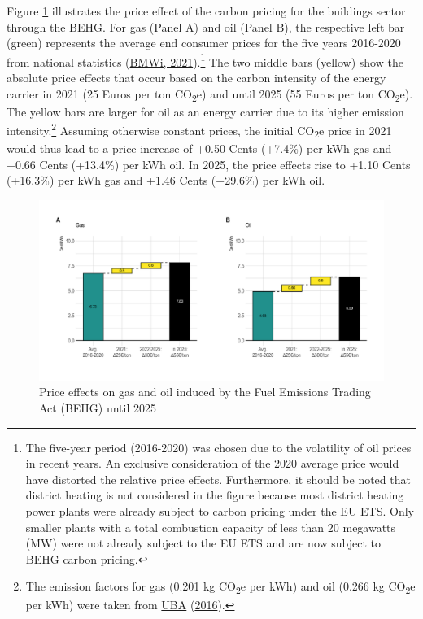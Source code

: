 \documentclass[12pt,twoside]{reedthesis}
\begin{document}
Figure \ref{fig:behg} illustrates the price effect of the carbon pricing for the buildings sector through the BEHG. For gas (Panel A) and oil (Panel B), the respective left bar (green) represents the average end consumer prices for the five years 2016-2020 from national statistics (\protect\hyperlink{ref-bmwi21}{BMWi, 2021}).\footnote{The five-year period (2016-2020) was chosen due to the volatility of oil prices in recent years. An exclusive consideration of the 2020 average price would have distorted the relative price effects. Furthermore, it should be noted that district heating is not considered in the figure because most district heating power plants were already subject to carbon pricing under the EU ETS. Only smaller plants with a total combustion capacity of less than 20 megawatts (MW) were not already subject to the EU ETS and are now subject to BEHG carbon pricing.} The two middle bars (yellow) show the absolute price effects that occur based on the carbon intensity of the energy carrier in 2021 (25 Euros per ton CO\textsubscript{2}e) and until 2025 (55 Euros per ton CO\textsubscript{2}e). The yellow bars are larger for oil as an energy carrier due to its higher emission intensity.\footnote{The emission factors for gas (0.201 kg CO\textsubscript{2}e per kWh) and oil (0.266 kg CO\textsubscript{2}e per kWh) were taken from \protect\hyperlink{ref-uba16}{UBA} (\protect\hyperlink{ref-uba16}{2016}).} Assuming otherwise constant prices, the initial CO\textsubscript{2}e price in 2021 would thus lead to a price increase of +0.50 Cents (+7.4\%) per kWh gas and +0.66 Cents (+13.4\%) per kWh oil. In 2025, the price effects rise to +1.10 Cents (+16.3\%) per kWh gas and +1.46 Cents (+29.6\%) per kWh oil.
\begin{figure}

{\centering \includegraphics[width=1\linewidth]{figure/price_effect_behg} 

}

\caption[BEHG carbon price effects on gas and oil until 2025]{Price effects on gas and oil induced by the Fuel Emissions Trading Act (BEHG) until 2025}\label{fig:behg}
\end{figure}
\end{document}
